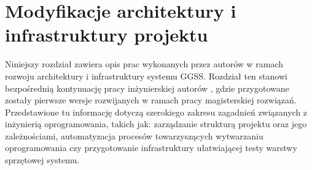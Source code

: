 \chapter{Modyfikacje architektury i infrastruktury projektu}
\label{cha:infra}

\graphicspath{{4_infrastructure/static/}}

Niniejszy rozdział zawiera opis prac wykonanych przez autorów w ramach rozwoju architektury i infrastruktury systemu GGSS. Rozdział ten stanowi bezpośrednią kontynuację pracy inżynierskiej autorów \cite{GGSS_inz}, gdzie przygotowane zostały pierwsze wersje rozwijanych w ramach pracy magisterskiej rozwiązań. Przedstawione tu informację dotyczą szerokiego zakresu zagadnień związanych z inżynierią oprogramowania, takich jak: zarządzanie strukturą projektu oraz jego zależnościami, automatyzacja procesów towarzyszących wytwarzaniu oprogramowania czy przygotowanie infrastruktury ułatwiającej testy warstwy sprzętowej systemu. 







